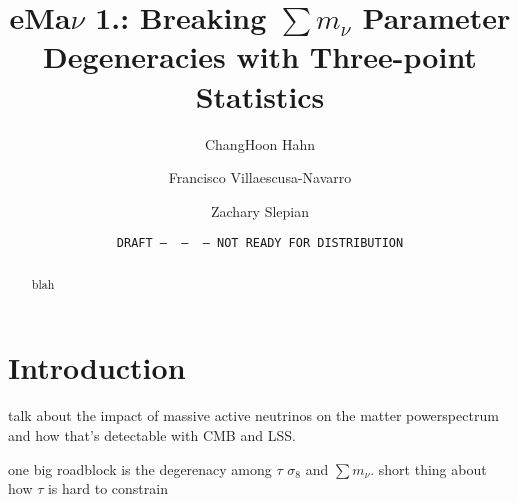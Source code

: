 \documentclass[12pt, letterpaper, preprint]{aastex62}
\begin{document}
\sloppy\sloppypar\frenchspacing 

\title{eMa$\nu$ 1.: Breaking $\sum m_\nu$ Parameter Degeneracies with Three-point Statistics} 
\date{\texttt{DRAFT~---~\githash~---~\gitdate~---~NOT READY FOR DISTRIBUTION}}


%
%

\author{ChangHoon Hahn}

\author{Francisco Villaescusa-Navarro} 

\author{Zachary Slepian} 

\begin{abstract}
blah 
\end{abstract}


\section{Introduction}
talk about the impact of massive active neutrinos on the matter powerspectrum and how that's detectable with CMB and LSS. 

one big roadblock is the degerenacy among $\tau$ $\sigma_8$ and $\sum m_\nu$.
short thing about how $\tau$ is hard to constrain

\end{document}
